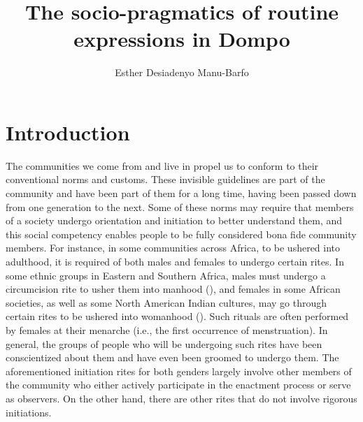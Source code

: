 \documentclass[output=paper,colorlinks,citecolor=brown]{langscibook}
\author{Esther Desiadenyo Manu-Barfo\affiliation{University of Ghana, Legon\\La Trobe University, Melbourne, Australia}}
\title{The socio-pragmatics of routine expressions in Dompo}
\begin{document}
\maketitle

\section{Introduction}

The communities we come from and live in propel us to conform to their conventional norms and customs. These invisible guidelines are part of the community and have been part of them for a long time, having been passed down from one generation to the next. Some of these norms may require that members of a society undergo orientation and initiation to better understand them, and this social competency enables people to be  fully considered bona fide community members. For instance, in some communities across Africa, to be ushered into adulthood, it is required of both males and females to undergo certain rites. In some ethnic groups in Eastern and Southern Africa, males must undergo a circumcision rite to usher them into manhood (\cite{BarkerRicardo05,Siweyaetal2018}), and females in some African societies, as well as some North American Indian cultures, may go through certain rites to be ushered into womanhood (\cite{Crentsil2015, Gyan2017, Johnson2018, Markstrom2008}). Such rituals are often performed by females at their menarche (i.e., the first occurrence of menstruation). In general, the groups of people who will be undergoing such  rites have been conscientized about them and have even been groomed to undergo them. The aforementioned initiation rites for both genders largely involve other members of the community who either actively participate in the enactment process or serve as observers. On the other hand, there are other rites that do not involve rigorous initiations. 
\end{document}
